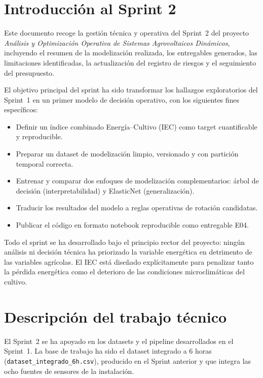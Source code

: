 \documentclass[12pt,a4paper]{article}
\begin{document}
\newpage
\section{Introducción al Sprint 2}

Este documento recoge la gestión técnica y operativa del Sprint~2 del proyecto \textit{Análisis y Optimización Operativa de Sistemas Agrovoltaicos Dinámicos}, incluyendo el resumen de la modelización realizada, los entregables generados, las limitaciones identificadas, la actualización del registro de riesgos y el seguimiento del presupuesto.

El objetivo principal del sprint ha sido transformar los hallazgos exploratorios del Sprint~1 en un primer modelo de decisión operativo, con los siguientes fines específicos:

\begin{itemize}[noitemsep]
  \item Definir un índice combinado Energía--Cultivo (IEC) como target cuantificable y reproducible.
  \item Preparar un dataset de modelización limpio, versionado y con partición temporal correcta.
  \item Entrenar y comparar dos enfoques de modelización complementarios: árbol de decisión (interpretabilidad) y ElasticNet (generalización).
  \item Traducir los resultados del modelo a reglas operativas de rotación candidatas.
  \item Publicar el código en formato notebook reproducible como entregable E04.
\end{itemize}

Todo el sprint se ha desarrollado bajo el principio rector del proyecto: ningún análisis ni decisión técnica ha priorizado la variable energética en detrimento de las variables agrícolas. El IEC está diseñado explícitamente para penalizar tanto la pérdida energética como el deterioro de las condiciones microclimáticas del cultivo.

\newpage
\section{Descripción del trabajo técnico}

El Sprint~2 se ha apoyado en los datasets y el pipeline desarrollados en el Sprint~1. La base de trabajo ha sido el dataset integrado a 6 horas (\texttt{dataset\_integrado\_6h.csv}), producido en el Sprint anterior y que integra las ocho fuentes de sensores de la instalación.
\end{document}
